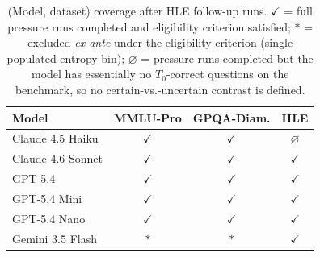 \begin{table}[h]
\centering
\small
\setlength{\tabcolsep}{6pt}
\renewcommand{\arraystretch}{1.15}
\caption{(Model, dataset) coverage after HLE follow-up runs.
  $\checkmark$ = full pressure runs completed and eligibility
  criterion satisfied; $\ast$ = excluded \emph{ex ante} under the
  eligibility criterion (single populated entropy bin);
  $\varnothing$ = pressure runs completed but the model has
  essentially no $T_0$-correct questions on the benchmark, so no
  certain-vs.-uncertain contrast is defined.}
\label{tab:coverage}
\begin{tabular}{l ccc}
\toprule
\textbf{Model} & \textbf{MMLU-Pro} & \textbf{GPQA-Diam.} & \textbf{HLE} \\
\midrule
Claude 4.5 Haiku     & $\checkmark$ & $\checkmark$ & $\varnothing$ \\
Claude 4.6 Sonnet    & $\checkmark$ & $\checkmark$ & $\checkmark$ \\
GPT-5.4              & $\checkmark$ & $\checkmark$ & $\checkmark$ \\
GPT-5.4 Mini         & $\checkmark$ & $\checkmark$ & $\checkmark$ \\
GPT-5.4 Nano         & $\checkmark$ & $\checkmark$ & $\checkmark$ \\
Gemini 3.5 Flash     & $\ast$       & $\ast$       & $\checkmark$ \\
\bottomrule
\end{tabular}
\end{table}
